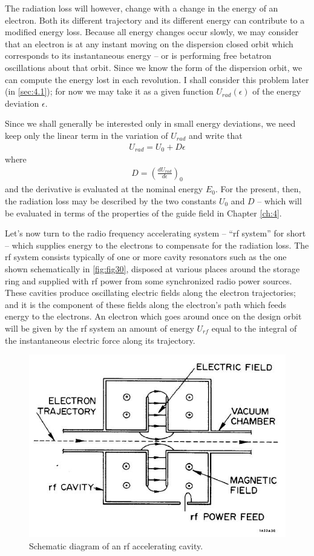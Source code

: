 The radiation loss will however, change with a change in the energy of an electron. Both its different trajectory and its different energy can contribute to a modified energy loss. Because all energy changes occur slowly, we may consider that an electron is at any instant moving on the dispersion closed orbit which corresponds to its instantaneous energy -- or is performing free betatron oscillations about that orbit. Since we know the form of the dispersion orbit, we can compute the energy lost in each revolution. I shall consider this problem later (in \autoref{sec:4.1}); for now we may take it as a given function $U_{rad}(\epsilon)$ of the energy deviation $\epsilon$.

Since we shall generally be interested only in small energy deviations, we need keep only the linear term in the variation of $U_{rad}$ and write that
\begin{align}
	U_{rad} = U_0 + D\epsilon\label{eq:3.23}
\end{align}
where
\begin{align} \label{eq:3.24}
	D = \left(\frac{dU_{rad}}{d\epsilon}\right)_0
\end{align}
and the derivative is evaluated at the nominal energy $E_0$. For the present, then, the radiation loss may be described by the two constants $U_0$ and $D$ -- which will be evaluated in terms of the properties of the guide field in Chapter \ref{ch:4}.

Let's now turn to the radio frequency accelerating system -- “rf system” for short -- which supplies energy to the electrons to compensate for the radiation loss. The rf system consists typically of one or more cavity resonators such as the one shown schematically in \autoref{fig:fig30}, disposed at various places around the storage ring
and supplied with rf power from some synchronized radio power sources. These cavities produce oscillating electric fields along the electron trajectories; and it is the component of these fields along the electron's path which feeds energy to the electrons. An electron which goes around once on the design orbit will be given by the rf system an amount of energy $U_{rf}$ equal to the integral of the instantaneous electric force along its trajectory.

 \begin{figure}[!htb]
 	\centering
 	\includegraphics[width=0.7\linewidth]{./Figuras/fig30.jpeg}
 	\caption{Schematic diagram of an rf accelerating cavity.}
 	\label{fig:fig30}
 \end{figure}

